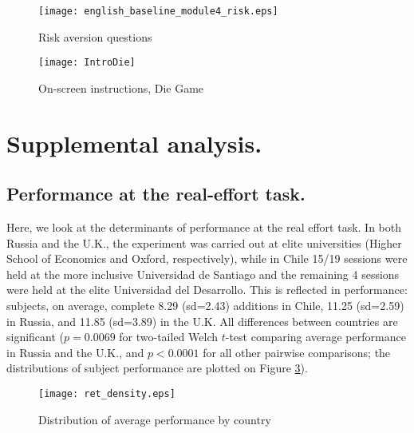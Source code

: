 \documentclass[12pt]{article}
\begin{document}
\begin{figure}[ht]
\centerline{\texttt{[image: english\_baseline\_module4\_risk.eps]}}
\caption{Risk aversion questions}
\label{fig:screen_risk2}
\end{figure}

\clearpage

\begin{figure}[ht]
\centerline{\texttt{[image: IntroDie]}}
\caption{On-screen instructions, Die Game}
\label{fig:diegame}
\end{figure}
\clearpage



\clearpage
\section{Supplemental analysis.}
\subsection{Performance at the real-effort task. }
\setcounter{table}{0}
\setcounter{figure}{0}
\label{subj_peft}

Here, we look at the determinants of performance at the real effort task.  In both Russia and the U.K., the experiment was carried out at elite universities (Higher School of Economics and Oxford, respectively), while in Chile 15/19 sessions were held at the more inclusive Universidad de Santiago and the remaining  4 sessions were held at the elite Universidad del Desarrollo. This is reflected in performance: subjects, on average, complete 8.29 (sd=2.43) additions in Chile, 11.25 (sd=2.59) in Russia, and 11.85 (sd=3.89) in the U.K. All differences between countries are significant ($p=0.0069$ for two-tailed Welch $t$-test comparing average performance in Russia and the U.K., and $p<0.0001$ for all other pairwise comparisons; the distributions of subject performance are plotted on Figure \ref{fig:correct_sums}).\label{stata:ret}


\begin{figure}[!htb]
\centerline{\texttt{[image: ret\_density.eps]}}
\caption{Distribution of average performance by country}\label{fig:correct_sums}
\end{figure}


\end{document}
